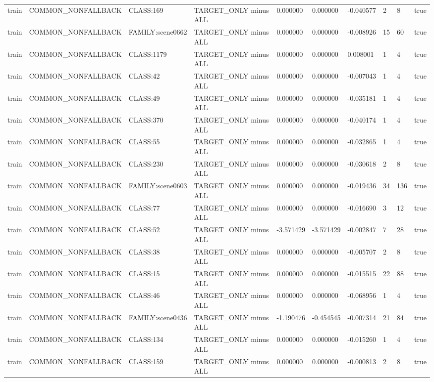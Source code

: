 \begin{tabular}{llllllllll}
train & COMMON\_NONFALLBACK & CLASS:169 & TARGET\_ONLY minus ALL & 0.000000 & 0.000000 & -0.040577 & 2 & 8 & true \\
train & COMMON\_NONFALLBACK & FAMILY:scene0662 & TARGET\_ONLY minus ALL & 0.000000 & 0.000000 & -0.008926 & 15 & 60 & true \\
train & COMMON\_NONFALLBACK & CLASS:1179 & TARGET\_ONLY minus ALL & 0.000000 & 0.000000 & 0.008001 & 1 & 4 & true \\
train & COMMON\_NONFALLBACK & CLASS:42 & TARGET\_ONLY minus ALL & 0.000000 & 0.000000 & -0.007043 & 1 & 4 & true \\
train & COMMON\_NONFALLBACK & CLASS:49 & TARGET\_ONLY minus ALL & 0.000000 & 0.000000 & -0.035181 & 1 & 4 & true \\
train & COMMON\_NONFALLBACK & CLASS:370 & TARGET\_ONLY minus ALL & 0.000000 & 0.000000 & -0.040174 & 1 & 4 & true \\
train & COMMON\_NONFALLBACK & CLASS:55 & TARGET\_ONLY minus ALL & 0.000000 & 0.000000 & -0.032865 & 1 & 4 & true \\
train & COMMON\_NONFALLBACK & CLASS:230 & TARGET\_ONLY minus ALL & 0.000000 & 0.000000 & -0.030618 & 2 & 8 & true \\
train & COMMON\_NONFALLBACK & FAMILY:scene0603 & TARGET\_ONLY minus ALL & 0.000000 & 0.000000 & -0.019436 & 34 & 136 & true \\
train & COMMON\_NONFALLBACK & CLASS:77 & TARGET\_ONLY minus ALL & 0.000000 & 0.000000 & -0.016690 & 3 & 12 & true \\
train & COMMON\_NONFALLBACK & CLASS:52 & TARGET\_ONLY minus ALL & -3.571429 & -3.571429 & -0.002847 & 7 & 28 & true \\
train & COMMON\_NONFALLBACK & CLASS:38 & TARGET\_ONLY minus ALL & 0.000000 & 0.000000 & -0.005707 & 2 & 8 & true \\
train & COMMON\_NONFALLBACK & CLASS:15 & TARGET\_ONLY minus ALL & 0.000000 & 0.000000 & -0.015515 & 22 & 88 & true \\
train & COMMON\_NONFALLBACK & CLASS:46 & TARGET\_ONLY minus ALL & 0.000000 & 0.000000 & -0.068956 & 1 & 4 & true \\
train & COMMON\_NONFALLBACK & FAMILY:scene0436 & TARGET\_ONLY minus ALL & -1.190476 & -0.454545 & -0.007314 & 21 & 84 & true \\
train & COMMON\_NONFALLBACK & CLASS:134 & TARGET\_ONLY minus ALL & 0.000000 & 0.000000 & -0.015260 & 1 & 4 & true \\
train & COMMON\_NONFALLBACK & CLASS:159 & TARGET\_ONLY minus ALL & 0.000000 & 0.000000 & -0.000813 & 2 & 8 & true \\

\end{tabular}
